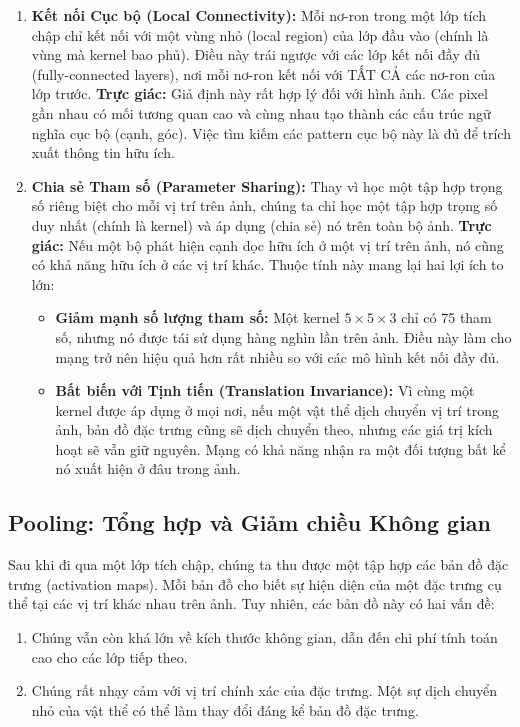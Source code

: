 \begin{enumerate}
	\item \textbf{Kết nối Cục bộ (Local Connectivity):} Mỗi nơ-ron trong một lớp tích chập chỉ kết nối với một vùng nhỏ (local region) của lớp đầu vào (chính là vùng mà kernel bao phủ). Điều này trái ngược với các lớp kết nối đầy đủ (fully-connected layers), nơi mỗi nơ-ron kết nối với TẤT CẢ các nơ-ron của lớp trước.
	\textbf{Trực giác:} Giả định này rất hợp lý đối với hình ảnh. Các pixel gần nhau có mối tương quan cao và cùng nhau tạo thành các cấu trúc ngữ nghĩa cục bộ (cạnh, góc). Việc tìm kiếm các pattern cục bộ này là đủ để trích xuất thông tin hữu ích.
	
	\item \textbf{Chia sẻ Tham số (Parameter Sharing):} Thay vì học một tập hợp trọng số riêng biệt cho mỗi vị trí trên ảnh, chúng ta chỉ học một tập hợp trọng số duy nhất (chính là kernel) và áp dụng (chia sẻ) nó trên toàn bộ ảnh.
	\textbf{Trực giác:} Nếu một bộ phát hiện cạnh dọc hữu ích ở một vị trí trên ảnh, nó cũng có khả năng hữu ích ở các vị trí khác. Thuộc tính này mang lại hai lợi ích to lớn:
	\begin{itemize}
		\item \textbf{Giảm mạnh số lượng tham số:} Một kernel $5 \times 5 \times 3$ chỉ có 75 tham số, nhưng nó được tái sử dụng hàng nghìn lần trên ảnh. Điều này làm cho mạng trở nên hiệu quả hơn rất nhiều so với các mô hình kết nối đầy đủ.
		\item \textbf{Bất biến với Tịnh tiến (Translation Invariance):} Vì cùng một kernel được áp dụng ở mọi nơi, nếu một vật thể dịch chuyển vị trí trong ảnh, bản đồ đặc trưng cũng sẽ dịch chuyển theo, nhưng các giá trị kích hoạt sẽ vẫn giữ nguyên. Mạng có khả năng nhận ra một đối tượng bất kể nó xuất hiện ở đâu trong ảnh.
	\end{itemize}
\end{enumerate}

\subsection{Pooling: Tổng hợp và Giảm chiều Không gian}
\label{subsec:pooling_mechanism}
Sau khi đi qua một lớp tích chập, chúng ta thu được một tập hợp các bản đồ đặc trưng (activation maps). Mỗi bản đồ cho biết sự hiện diện của một đặc trưng cụ thể tại các vị trí khác nhau trên ảnh. Tuy nhiên, các bản đồ này có hai vấn đề:
\begin{enumerate}
	\item Chúng vẫn còn khá lớn về kích thước không gian, dẫn đến chi phí tính toán cao cho các lớp tiếp theo.
	\item Chúng rất nhạy cảm với vị trí chính xác của đặc trưng. Một sự dịch chuyển nhỏ của vật thể có thể làm thay đổi đáng kể bản đồ đặc trưng.
\end{enumerate}

